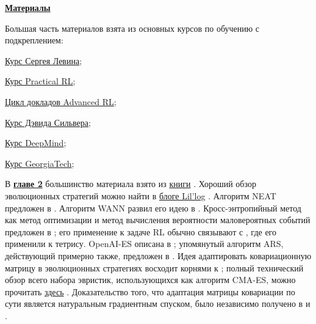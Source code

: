 \newcommand*{\sectionsources}[1]{\textbf{\textcolor{ChadBlue}{\underline{#1}}}}

\newpage
\begin{center}
\huge \textbf{\textcolor{ChadBlue}{\underline{Материалы}}}

\normalsize
\vspace{0.3cm}
Большая часть материалов взята из основных курсов по обучению с подкреплением:

\vspace{0.3cm}
\href{https://www.youtube.com/playlist?list=PL_iWQOsE6TfURIIhCrlt-wj9ByIVpbfGc}{Курс Сергея Левина}; %

\vspace{0.3cm}
\href{https://github.com/yandexdataschool/Practical_RL}{Курс Practical RL};

\vspace{0.3cm}
\href{https://deeppavlov.ai/rl_course_2020}{Цикл докладов Advanced RL};

\vspace{0.3cm}
\href{https://www.davidsilver.uk/teaching/}{Курс Дэвида Сильвера};

\vspace{0.3cm}
\href{https://www.youtube.com/watch?v=ISk80iLhdfU&list=PLqYmG7hTraZBKeNJ-JE_eyJHZ7XgBoAyb&index=1}{Курс DeepMind};

\vspace{0.3cm}
\href{https://www.udacity.com/course/reinforcement-learning--ud600}{Курс GeorgiaTech};
\end{center}

В \underline{\textbf{главе 2}} большинство материала взято из \href{https://cs.gmu.edu/~sean/book/metaheuristics/Essentials.pdf}{книги} \cite{luke2013essentials}. Хороший обзор эволюционных стратегий можно найти в \href{https://lilianweng.github.io/lil-log/2019/09/05/evolution-strategies.html}{блоге Lil'log} \cite{weng2019ES}. Алгоритм NEAT предложен в \cite{stanley2002evolving}. Алгоритм WANN развил его идею в \cite{gaier2019weight}. Кросс-энтропийный метод как метод оптимизации и метод вычисления вероятности маловероятных событий предложен в \cite{botev2013cross}; его применение к задаче RL обычно связывают с \cite{szita2006learning}, где его применили к тетрису. OpenAI-ES описана в \cite{salimans2017evolution}; упомянутый алгоритм ARS, действующий примерно также, предложен в \cite{mania2018simple}. Идея адаптировать ковариационную матрицу в эволюционных стратегиях восходит корнями к \cite{hansen1996adapting}; полный технический обзор всего набора эвристик, использующихся как алгоритм CMA-ES, можно прочитать \href{https://arxiv.org/pdf/1604.00772.pdf}{здесь} \cite{hansen2016cma}. Доказательство того, что адаптация матрицы ковариации по сути является натуральным градиентным спуском, было независимо получено в \cite{akimoto2010bidirectional} и \cite{glasmachers2010exponential}.

